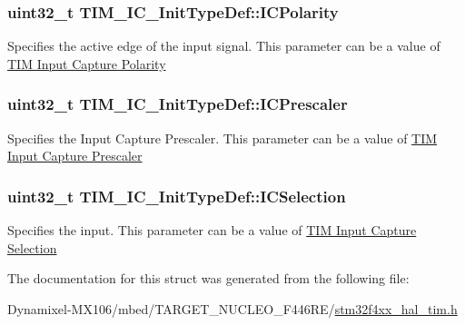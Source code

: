 \subsubsection[{\texorpdfstring{I\+C\+Polarity}{ICPolarity}}]{\setlength{\rightskip}{0pt plus 5cm}uint32\+\_\+t T\+I\+M\+\_\+\+I\+C\+\_\+\+Init\+Type\+Def\+::\+I\+C\+Polarity}\hypertarget{struct_t_i_m___i_c___init_type_def_ab122383ebc0926c49a814546471da9b3}{}\label{struct_t_i_m___i_c___init_type_def_ab122383ebc0926c49a814546471da9b3}
Specifies the active edge of the input signal. This parameter can be a value of \hyperlink{group___t_i_m___input___capture___polarity}{T\+IM Input Capture Polarity} 
\subsubsection[{\texorpdfstring{I\+C\+Prescaler}{ICPrescaler}}]{\setlength{\rightskip}{0pt plus 5cm}uint32\+\_\+t T\+I\+M\+\_\+\+I\+C\+\_\+\+Init\+Type\+Def\+::\+I\+C\+Prescaler}\hypertarget{struct_t_i_m___i_c___init_type_def_a452a4a459b6f7b7c478db032de9b0d72}{}\label{struct_t_i_m___i_c___init_type_def_a452a4a459b6f7b7c478db032de9b0d72}
Specifies the Input Capture Prescaler. This parameter can be a value of \hyperlink{group___t_i_m___input___capture___prescaler}{T\+IM Input Capture Prescaler} 
\subsubsection[{\texorpdfstring{I\+C\+Selection}{ICSelection}}]{\setlength{\rightskip}{0pt plus 5cm}uint32\+\_\+t T\+I\+M\+\_\+\+I\+C\+\_\+\+Init\+Type\+Def\+::\+I\+C\+Selection}\hypertarget{struct_t_i_m___i_c___init_type_def_aad80556490de79727ba1269c851e9724}{}\label{struct_t_i_m___i_c___init_type_def_aad80556490de79727ba1269c851e9724}
Specifies the input. This parameter can be a value of \hyperlink{group___t_i_m___input___capture___selection}{T\+IM Input Capture Selection} 

The documentation for this struct was generated from the following file\+:\begin{DoxyCompactItemize}
\item 
Dynamixel-\/\+M\+X106/mbed/\+T\+A\+R\+G\+E\+T\+\_\+\+N\+U\+C\+L\+E\+O\+\_\+\+F446\+R\+E/\hyperlink{stm32f4xx__hal__tim_8h}{stm32f4xx\+\_\+hal\+\_\+tim.\+h}\end{DoxyCompactItemize}
